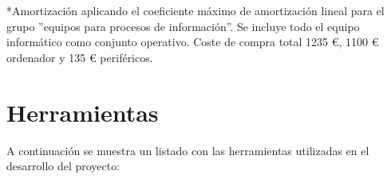 *Amortización aplicando el coeficiente máximo de amortización lineal para el grupo ''equipos para procesos de información''\cite{amortizacion}. Se incluye todo el equipo informático como conjunto operativo. Coste de compra total 1235 €, 1100 € ordenador y 135 € periféricos.


\section{Herramientas}
A continuación se muestra un listado con las herramientas utilizadas en el desarrollo del proyecto: